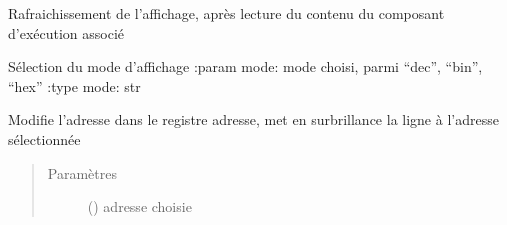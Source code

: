 \documentclass[letterpaper,10pt,french]{sphinxmanual}
\begin{document}
\begin{fulllineitems}
\begin{fulllineitems}
\end{fulllineitems}


\begin{fulllineitems}
\label{\detokenize{widgets:widgets.MemoryWidget.refresh}}
Rafraichissement de l’affichage, après lecture du contenu
du composant d’exécution associé

\end{fulllineitems}


\begin{fulllineitems}
\label{\detokenize{widgets:widgets.MemoryWidget.selectMode}}
Sélection du mode d’affichage
:param mode: mode choisi, parmi “dec”, “bin”, “hex”
:type mode: str

\end{fulllineitems}


\begin{fulllineitems}
\label{\detokenize{widgets:widgets.MemoryWidget.writeAddress}}
Modifie l’adresse dans le registre adresse,
met en surbrillance la ligne à l’adresse sélectionnée
\begin{quote}\begin{description}
\item[{Paramètres}] \leavevmode
{} ({\hyperref[\detokenize{executeurcomponents:executeurcomponents.DataValue}]{}}) \textendash{} adresse choisie

\end{description}\end{quote}

\end{fulllineitems}



\end{fulllineitems}
\end{document}
